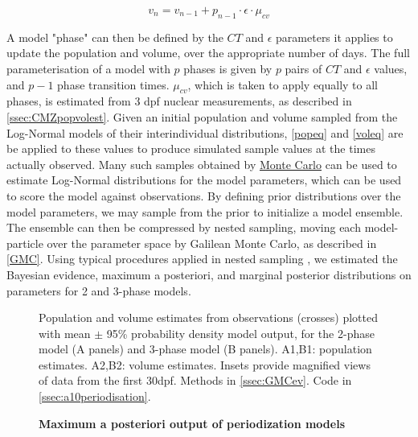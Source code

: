 \begin{equation}
    v_n=v_{n-1} + p_{n-1} \cdot \epsilon \cdot \mu_{cv}
    \label{voleq}
\end{equation}

A model "phase" can then be defined by the $CT$ and $\epsilon$ parameters it applies to update the population and volume, over the appropriate number of days. The full parameterisation of a model with $p$ phases is given by $p$ pairs of $CT$ and $\epsilon$ values, and $p-1$ phase transition times. $\mu_{cv}$, which is taken to apply equally to all phases, is estimated from 3 dpf nuclear measurements, as described in \autoref{ssec:CMZpopvolest}. Given an initial population and volume sampled from the Log-Normal models of their interindividual distributions, \autoref{popeq} and \autoref{voleq} are be applied to these values to produce simulated sample values at the times actually observed. Many such samples obtained by \hyperref[ssec:Montecarlo]{Monte Carlo} can be used to estimate Log-Normal distributions for the model parameters, which can be used to score the model against observations. By defining prior distributions over the model parameters, we may sample from the prior to initialize a model ensemble. The ensemble can then be compressed by nested sampling, moving each model-particle over the parameter space by Galilean Monte Carlo, as described in \autoref{GMC}. Using typical procedures applied in nested sampling \cite{Skilling2006}, we estimated the Bayesian evidence, maximum a posteriori, and marginal posterior distributions on parameters for 2 and 3-phase models.

\begin{figure}[!h]
    \caption{{\bf Maximum a posteriori output of periodization models}}
    \label{phaseMAPout}
    Population and volume estimates from observations (crosses) plotted with mean $\pm$ 95\% probability density model output, for the 2-phase model (A panels) and 3-phase model (B panels). A1,B1: population estimates. A2,B2: volume estimates. Insets provide magnified views of data from the first 30dpf.
    Methods in \autoref{ssec:GMCev}.
    Code in \autoref{ssec:a10periodisation}.
\end{figure}

